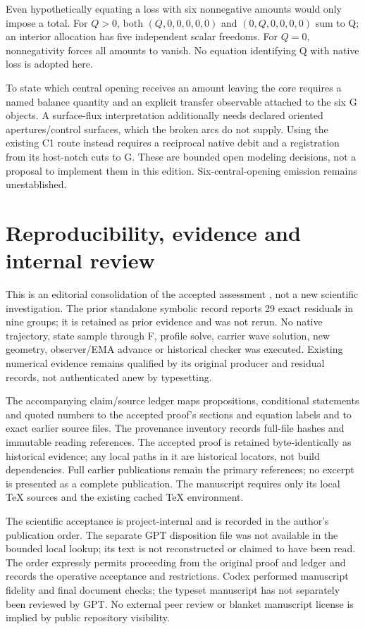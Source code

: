 Even hypothetically equating a loss with six nonnegative amounts would only impose a total. For $Q>0$, both $(Q,0,0,0,0,0)$ and $(0,Q,0,0,0,0)$ sum to Q; an interior allocation has five independent scalar freedoms. For $Q=0$, nonnegativity forces all amounts to vanish. No equation identifying Q with native loss is adopted here.

To state which central opening receives an amount leaving the core requires a named balance quantity and an explicit transfer observable attached to the six G objects. A surface-flux interpretation additionally needs declared oriented apertures/control surfaces, which the broken arcs do not supply. Using the existing C1 route instead requires a reciprocal native debit and a registration from its host-notch cuts to G. These are bounded open modeling decisions, not a proposal to implement them in this edition. Six-central-opening emission remains unestablished.

\section{Reproducibility, evidence and internal review}
This is an editorial consolidation of the accepted assessment \cite{assessment}, not a new scientific investigation. The prior standalone symbolic record reports 29 exact residuals in nine groups; it is retained as prior evidence and was not rerun. No native trajectory, state sample through F, profile solve, carrier wave solution, new geometry, observer/EMA advance or historical checker was executed. Existing numerical evidence remains qualified by its original producer and residual records, not authenticated anew by typesetting.

The accompanying claim/source ledger maps propositions, conditional statements and quoted numbers to the accepted proof's sections and equation labels and to exact earlier source files. The provenance inventory records full-file hashes and immutable reading references. The accepted proof is retained byte-identically as historical evidence; any local paths in it are historical locators, not build dependencies. Full earlier publications remain the primary references; no excerpt is presented as a complete publication. The manuscript requires only its local TeX sources and the existing cached TeX environment.

The scientific acceptance is project-internal and is recorded in the author's publication order. The separate GPT disposition file was not available in the bounded local lookup; its text is not reconstructed or claimed to have been read. The order expressly permits proceeding from the original proof and ledger and records the operative acceptance and restrictions. Codex performed manuscript fidelity and final document checks; the typeset manuscript has not separately been reviewed by GPT. No external peer review or blanket manuscript license is implied by public repository visibility.

